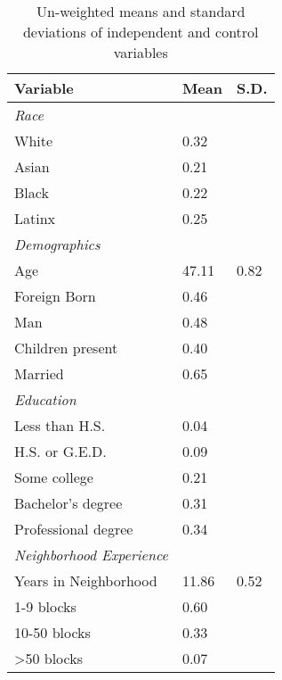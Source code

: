 % 
\begin{table}[ht]
\centering
\caption{Un-weighted means and standard deviations of independent and control variables} 
\label{tab:descriptives}
\begin{tabular}{lp{.5in}p{.5in}}
  \toprule
Variable & Mean & S.D. \\ 
  \midrule
\emph{Race}&&\\White &  0.32 &  \\ 
  Asian &  0.21 &  \\ 
  Black &  0.22 &  \\ 
  Latinx &  0.25 &  \\ 
  \emph{Demographics}&&\\Age & 47.11 & 0.82 \\ 
  Foreign Born &  0.46 &  \\ 
  Man &  0.48 &  \\ 
  Children present &  0.40 &  \\ 
  Married &  0.65 &  \\ 
  \emph{Education}&&\\Less than H.S. &  0.04 &  \\ 
  H.S. or G.E.D. &  0.09 &  \\ 
  Some college &  0.21 &  \\ 
  Bachelor's degree &  0.31 &  \\ 
  Professional degree &  0.34 &  \\ 
  \emph{Neighborhood Experience}\\Years in Neighborhood & 11.86 & 0.52 \\ 
  1-9 blocks &  0.60 &  \\ 
  10-50 blocks &  0.33 &  \\ 
  >50 blocks &  0.07 &  \\ 
   \bottomrule
\end{tabular}
\end{table}
